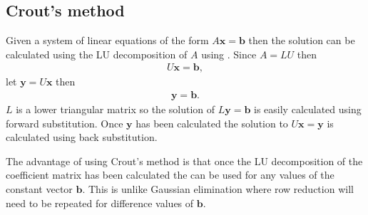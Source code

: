 \documentclass[letterpaper,10pt,english]{jupyterBook}
\begin{document}
\subsection{Crout’s method}
\label{\detokenize{6_Direct_methods/6.1_LU_decomposition:crout-s-method}}\label{\detokenize{6_Direct_methods/6.1_LU_decomposition:crouts-method-section}}
\sphinxAtStartPar
Given a system of linear equations of the form \(A \mathbf{x} = \mathbf{b}\) then the solution can be calculated using the LU decomposition of \(A\) using . Since \(A = LU\) then
\begin{align*}
    U\mathbf{x} = \mathbf{b},
\end{align*}
\sphinxAtStartPar
let \(\mathbf{y} = U \mathbf{x}\) then
\begin{align*}
    \mathbf{y} = \mathbf{b}.
\end{align*}
\sphinxAtStartPar
\(L\) is a lower triangular matrix so the solution of \(L \mathbf{y} = \mathbf{b}\) is easily calculated using forward substitution. Once \(\mathbf{y}\) has been calculated the solution to \(U\mathbf{x} = \mathbf{y}\) is calculated using back substitution.

\sphinxAtStartPar
The advantage of using Crout’s method is that once the LU decomposition of the coefficient matrix has been calculated the can be used for any values of the constant vector \(\mathbf{b}\). This is unlike Gaussian elimination where row reduction will need to be repeated for difference values of \(\mathbf{b}\).
\end{document}
